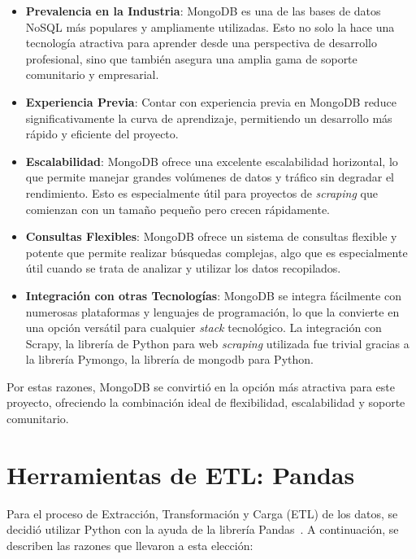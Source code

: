 \begin{itemize}
\item \textbf{Prevalencia en la Industria}: MongoDB es una de las bases de datos NoSQL más populares y ampliamente utilizadas. Esto no solo la hace una tecnología atractiva para aprender desde una perspectiva de desarrollo profesional, sino que también asegura una amplia gama de soporte comunitario y empresarial.

\item \textbf{Experiencia Previa}: Contar con experiencia previa en MongoDB reduce significativamente la curva de aprendizaje, permitiendo un desarrollo más rápido y eficiente del proyecto.

\item \textbf{Escalabilidad}: MongoDB ofrece una excelente escalabilidad horizontal, lo que permite manejar grandes volúmenes de datos y tráfico sin degradar el rendimiento. Esto es especialmente útil para proyectos de \textit{scraping} que comienzan con un tamaño pequeño pero crecen rápidamente.

\item \textbf{Consultas Flexibles}: MongoDB ofrece un sistema de consultas flexible y potente que permite realizar búsquedas complejas, algo que es especialmente útil cuando se trata de analizar y utilizar los datos recopilados.

\item \textbf{Integración con otras Tecnologías}: MongoDB se integra fácilmente con numerosas plataformas y lenguajes de programación, lo que la convierte en una opción versátil para cualquier \textit{stack} tecnológico. La integración con Scrapy, la librería de Python para web \textit{scraping} utilizada fue trivial gracias a la librería Pymongo, la librería de mongodb para Python.
\end{itemize}

Por estas razones, MongoDB se convirtió en la opción más atractiva para este proyecto, ofreciendo la combinación ideal de flexibilidad, escalabilidad y soporte comunitario.

\section{Herramientas de ETL: Pandas}\label{sec:etl_section}

Para el proceso de Extracción, Transformación y Carga (ETL) de los datos, se decidió utilizar Python con la ayuda de la librería Pandas~\cite{pandas}. A continuación, se describen las razones que llevaron a esta elección:

